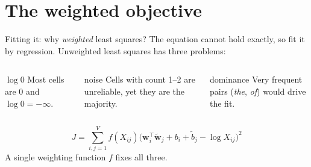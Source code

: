 \documentclass[aspectratio=169,11pt]{beamer}
\newcommand{\wv}{\mathbf{w}}
\newcommand{\cv}{\tilde{\mathbf{w}}}
\begin{document}
\section{The weighted objective}

\begin{frame}{Fitting it: why \emph{weighted} least squares?}
The equation cannot hold exactly, so fit it by regression. Unweighted least squares has three problems:
\vspace{2mm}
\begin{columns}[T]
\begin{block}{$\log 0$}
Most cells are 0 and $\log 0=-\infty$.
\end{block}
\begin{block}{noise}
Cells with count 1--2 are unreliable, yet they are the majority.
\end{block}
\begin{block}{dominance}
Very frequent pairs (\emph{the}, \emph{of}) would drive the fit.
\end{block}
\end{columns}
\vspace{4mm}
\[
J=\sum_{i,j=1}^{V} f(X_{ij})\Big(\wv_i^\top\cv_j+b_i+\tilde b_j-\log X_{ij}\Big)^2
\]
\centering\small
A single weighting function $f$ fixes all three.
\end{frame}
\end{document}
